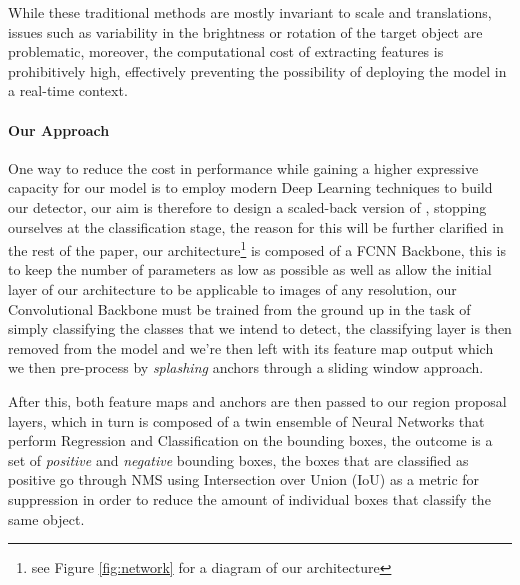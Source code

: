 \documentclass[10pt,journal,cspaper,compsoc]{IEEEtran}
\begin{document}
    While these traditional methods are mostly invariant to scale and translations, issues such as 
    variability in the brightness or rotation of the target object are problematic, moreover, the 
    computational cost of extracting features is prohibitively high, effectively preventing the possibility
    of deploying the model in a real-time context.

    \paragraph*{Our Approach}
    One way to reduce the cost in performance while gaining a higher expressive capacity for our model is to employ
    modern Deep Learning techniques to build our detector, our aim is therefore to 
    design a scaled-back version of \cite{arxiv:FasterRCNN}, stopping ourselves at the classification stage,
    the reason for this will be further clarified in the rest of the paper, our architecture\footnote{see 
    Figure \ref{fig:network} for a diagram
    of our architecture} is composed of a FCNN\cite{Chen:FCNN,Simonyan:VCC16} Backbone, this is to keep the number 
    of parameters as low as possible as well as allow the initial layer of our architecture to be applicable to images 
    of any resolution, our Convolutional Backbone must be trained from the ground up in the task of simply classifying 
    the classes that we intend to detect, the classifying layer is then removed from the model and we're then
    left with its feature map output which we then pre-process by \emph{splashing} anchors through a sliding window 
    approach.

        

    After this, both feature maps and anchors are then passed to our region proposal layers, which in turn is composed 
    of a twin ensemble of Neural Networks that perform Regression and Classification on the bounding boxes, the outcome is a set of 
    \emph{positive} and \emph{negative} bounding boxes, the boxes that are classified as positive 
    go through NMS\cite{Neubeck:NMS} using Intersection over Union (IoU) \cite{Rezatofighi:IoU} as a metric for suppression
    in order to reduce the amount of individual boxes that classify the same object.

    
\end{document}
